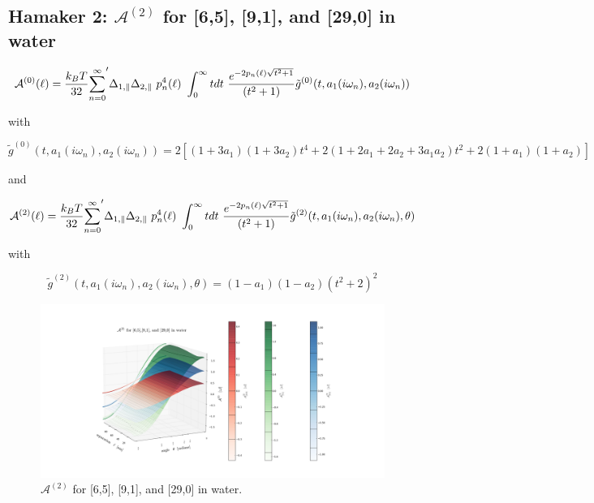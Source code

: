 \documentclass[a4paper]{article}
\begin{document}
\begin{center}
\subsection{Hamaker 2: $\mathcal{A}^{(2)}$ for [6,5], [9,1], and [29,0] in water }
\begin{equation}
{\cal A}^{(0)}(\ell) = \frac{k_BT}{32}  {\sum_{n=0}^{\infty}}' \Delta_{1,\parallel} \Delta_{2,\parallel} ~p_n^{4}(\ell) ~\int_0^{\infty} t dt ~\frac{e^{- 2 p_n(\ell) \sqrt{t^{2} + 1}}}{(t^{2} + 1)} \tilde g^{(0)}(t, a_1(i \omega_n), a_2(i \omega_n))
\end{equation}

with

\begin{equation}
\tilde g^{(0)}(t, a_1(i \omega_n), a_2(i \omega_n)) = 2 \left[ (1+3a_1)(1+3a_2) t^{4} + 2 (1+2a_1+2a_2+3a_1a_2) t^{2}  + 2(1+a_1)(1+a_2)\right]
\end{equation}

and

\begin{equation}
{\cal A}^{(2)}(\ell) = \frac{k_BT}{32}  {\sum_{n=0}^{\infty}}' \Delta_{1,\parallel} \Delta_{2,\parallel} ~p_n^{4}(\ell) ~\int_0^{\infty} t dt ~\frac{e^{- 2 p_n(\ell) \sqrt{t^{2} + 1}}}{(t^{2} + 1)} \tilde g^{(2)}(t, a_1(i \omega_n), a_2(i \omega_n), \theta)
\end{equation}

with

\begin{equation}
\tilde g^{(2)}(t, a_1(i \omega_n), a_2(i \omega_n), \theta) = (1-a_1)(1-a_2)(t^{2} + 2)^2
\label{befgqw}
\end{equation}

\begin{figure}[t!]
\begin{center}
\includegraphics[width=1.5\textwidth]{plots/A2_65_91_290_srw.png}
\hskip 43pt
\caption{$\mathcal{A}^{(2)}$ for [6,5], [9,1], and [29,0] in water.}
\label{eiz65}
\end{center}
\end{figure} 


\end{center}
\end{document}
